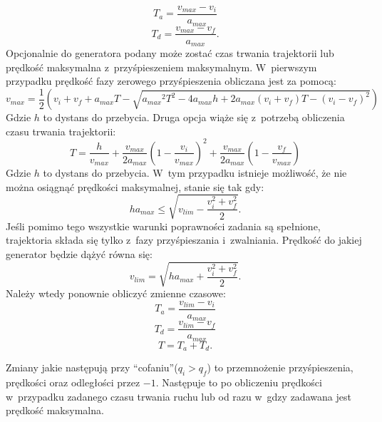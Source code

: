 \documentclass[a4paper, 12pt]{article}
\begin{document}
	\begin{equation}
	\label{eq:ta1}
	T_a = \frac{v_{max}-v_i}{a_{max}}
	\end{equation}
	\begin{equation}
	\label{eq:td1}
	T_d = \frac{v_{max}-v_f}{a_{max}}.
	\end{equation}
	Opcjonalnie do generatora podany może zostać czas trwania trajektorii lub prędkość maksymalna z~przyśpieszeniem maksymalnym. W~pierwszym przypadku prędkość fazy zerowego przyśpieszenia obliczana jest za pomocą:
	\begin{equation}
	\label{eq:vmax1}
	v_{max}=\frac{1}{2}(v_i+v_f+a_{max}T-\sqrt{{a_{max}}^2T^2-4a_{max}h+2a_{max}(v_i+v_f)T-(v_i-v_f)^2})
	\end{equation}
	{\footnotesize Gdzie $ h $ to dystans do przebycia.}\newline
	Druga opcja wiąże się z~potrzebą obliczenia czasu trwania trajektorii:
	\begin{equation}
	\label{eq:t1}
	T=\frac{h}{v_{max}}+\frac{v_{max}}{2a_{max}}(1-\frac{v_i}{v_{max}})^2+\frac{v_{max}}{2a_{max}}(1-\frac{v_f}{v_{max}})
	\end{equation}
	{\footnotesize Gdzie $ h $ to dystans do przebycia.}\newline
	W~tym przypadku istnieje możliwość, że nie można osiągnąć prędkości maksymalnej, stanie się tak gdy:
	\begin{equation}
	\label{eq:vmaxlim}
	ha_{max}\leq\sqrt{v_{lim}-\frac{v_i^2+v_f^2}{2}}.
	\end{equation}
	Jeśli pomimo tego wszystkie warunki poprawności zadania są spełnione, trajektoria składa się tylko z~fazy przyśpieszania i~zwalniania. Prędkość do jakiej generator będzie dążyć równa się:
	\begin{equation}
	\label{eq:vlim}
	v_{lim}=\sqrt{ha_{max}+\frac{v_i^2+v_f^2}{2}}.
	\end{equation}
	Należy wtedy ponownie obliczyć zmienne czasowe:
	\begin{equation}
	\label{eq:ta2}
	T_a = \frac{v_{lim}-v_i}{a_{max}}
	\end{equation}
	\begin{equation}
	\label{eq:td2}
	T_d = \frac{v_{lim}-v_f}{a_{max}}
	\end{equation}
	\begin{equation}
	\label{eq:t2}
	T = T_a+T_d.
	\end{equation}
	\par Zmiany jakie następują przy \textquotedblleft cofaniu\textquotedblright ($q_i>q_f$) to przemnożenie przyśpieszenia, prędkości oraz odległości przez $-1$. Następuje to po obliczeniu prędkości w~przypadku zadanego czasu trwania ruchu lub od razu w~gdzy zadawana jest prędkość maksymalna. 
	
\end{document}
